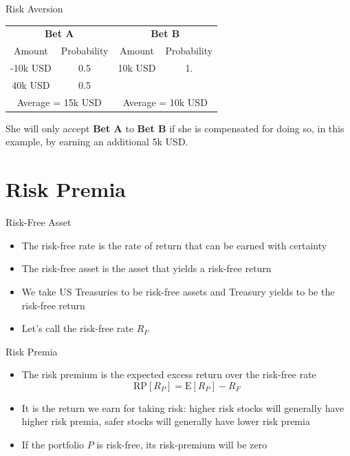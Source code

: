 \documentclass{beamer}
\begin{document}
\begin{frame}{Risk Aversion}
	\begin{center}
		\renewcommand{\arraystretch}{1.5}
		\begin{tabular}{cc|cc}
			\multicolumn{2}{c}{\textbf{Bet A}} & \multicolumn{2}{c}{\textbf{Bet B}} \\
			Amount & Probability & Amount & Probability \\ \hline
			-10k USD & 0.5 & 10k USD & 1. \\
			40k USD & 0.5 & & \\ \hline
			\multicolumn{2}{c}{Average = 15k USD} & \multicolumn{2}{c}{Average = 10k USD}
		\end{tabular}
	\end{center}
\begin{center}
She will only accept \textbf{Bet A} to \textbf{Bet B} if she is compensated for doing so, in this example, by earning an additional 5k USD.
\end{center}
\end{frame}

\section{Risk Premia}

\begin{frame}{Risk-Free Asset}
	\begin{itemize}
		\item The risk-free rate is the rate of return that can be earned with certainty
		\item The risk-free asset is the asset that yields a risk-free return
		\item We take US Treasuries to be risk-free assets and Treasury yields to be the risk-free return
		\item Let's call the risk-free rate $R_{F}$ 
	\end{itemize}
\end{frame}

\begin{frame}{Risk Premia}
	\begin{itemize}
		\item The risk premium is the expected excess return over the risk-free rate
		\begin{equation}
			\text{RP}[R_{P}]=\text{E}[R_{P}]-R_{F}
		\end{equation}
		\item It is the return we earn for taking risk: higher risk stocks will generally have higher risk premia, safer stocks will generally have lower risk premia
		\item If the portfolio $P$ is risk-free, its risk-premium will be zero
	\end{itemize}
\end{frame}
\end{document}
